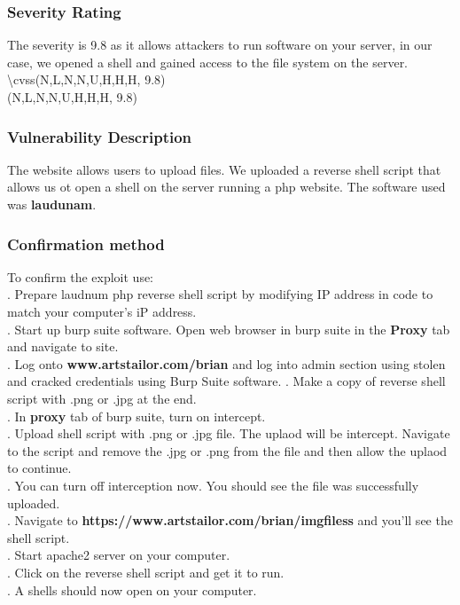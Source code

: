 \documentclass[notitlepage]{article}
\begin{document}
	\subsubsection{Severity Rating}
	\indent The severity is 9.8 as it allows attackers to run software on your server, in our case, we opened a shell and gained access to the file system on the server.  \\
	
	\textbackslash cvss(N,L,N,N,U,H,H,H, 9.8)\\
	\cvss(N,L,N,N,U,H,H,H, 9.8) \\
	
	\subsubsection{Vulnerability Description}
	\indent The website allows users to upload files. We uploaded a reverse shell script that allows us ot open a shell on the server running a php website. The software used was \textbf{laudunam}. \\
	
	\subsubsection{Confirmation method}
	To confirm the exploit use: \\
	. Prepare laudnum php reverse shell script by modifying IP address in code to match your computer's iP address.   \\
	. Start up burp suite software.  Open web browser in burp suite in the \textbf{Proxy} tab and navigate to site.   \\
	. Log onto \textbf{www.artstailor.com/brian} and log into admin section using stolen and cracked credentials using Burp Suite software.  
	. Make a copy of reverse shell script with .png or .jpg at the end.\\
	. In \textbf{proxy} tab of burp suite, turn on intercept. \\
	. Upload shell script with .png or .jpg file.  The uplaod will be intercept.  Navigate to the script and remove the .jpg or .png from the file and then allow the uplaod to continue. \\
	. You can turn off interception now.  You should see the file was successfully uploaded. \\
	. Navigate to \textbf{https://www.artstailor.com/brian/imgfiless} and you'll see the shell script. \\
	. Start apache2 server on your computer. \\
	. Click on the reverse shell script and get it to run.\\
	. A shells should now open on your computer.  \\
	
\end{document}
